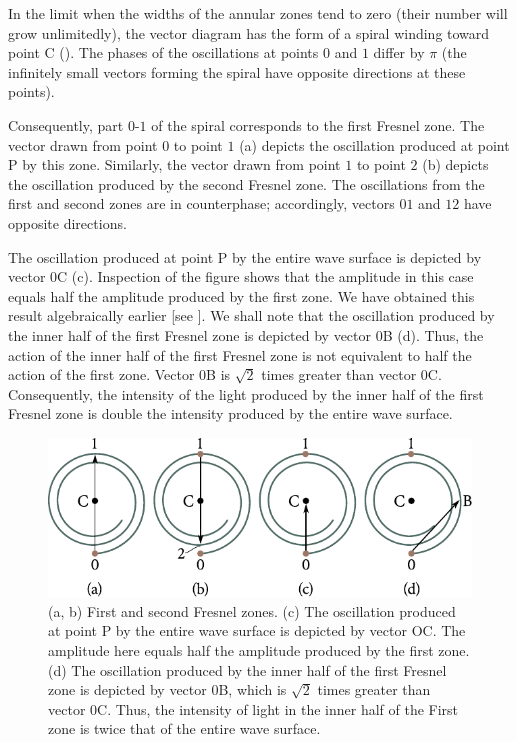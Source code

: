 In the limit when the widths of the annular zones tend to zero (their number will grow unlimitedly), the vector diagram has the form of a spiral winding toward point C ().
The phases of the oscillations at points $0$ and $1$ differ by $\pi$ (the infinitely small vectors forming the spiral have opposite directions at these points).

Consequently, part $0$-$1$ of the spiral corresponds to the first Fresnel zone.
The vector drawn from point $0$ to point $1$ (a) depicts the oscillation produced at point P by this zone.
Similarly, the vector drawn from point $1$ to point $2$ (b) depicts the oscillation produced by the second Fresnel zone.
The oscillations from the first and second zones are in counterphase; accordingly, vectors $01$ and $12$ have opposite directions.

The oscillation produced at point P by the entire wave surface is depicted by vector $0$C (c).
Inspection of the figure shows that the amplitude in this case equals half the amplitude produced
by the first zone.
We have obtained this result algebraically earlier [see ].
We shall note that the oscillation produced by the
inner half of the first Fresnel zone is depicted by vector $0$B (d).
Thus, the action of the inner half of the first Fresnel zone is not equivalent to half the action of the first zone.
Vector $0$B is $\sqrt{2}$ times greater than vector $0$C.
Consequently, the intensity of the light produced by the inner half of the first Fresnel zone is double the intensity produced by the entire wave surface.

\begin{figure}[!htb]
	\begin{center}
		\includegraphics[scale=0.9]{figures/ch_18/fig_18_8.pdf}
        \caption[]{(a, b) First and second Fresnel zones. (c) The oscillation produced at point P by the entire wave surface is depicted by vector OC. The amplitude here equals half the amplitude produced by the first zone. (d) The oscillation produced by the inner half of the first Fresnel zone is depicted by vector $0$B, which is $\sqrt{2}$ times greater than vector $0$C. Thus, the intensity of light in the inner half of the First zone is twice that of the entire wave surface.}
		\label{fig:18_8}
	\end{center}
	\vspace{-0.8cm}
\end{figure}


